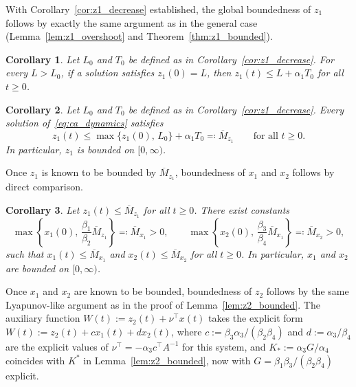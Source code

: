 \documentclass{article}
\newtheorem{corollary}{Corollary}
\begin{document}
With Corollary~\ref{cor:z1_decrease} established, the global boundedness 
of $z_1$ follows by exactly the same argument as in the general case 
(Lemma~\ref{lem:z1_overshoot} and Theorem~\ref{thm:z1_bounded}).

\begin{corollary}\label{cor:z1_overshoot_4d}
    Let $L_0$ and $T_0$ be defined as in Corollary~\ref{cor:z1_decrease}. For 
    every $L>L_0$, if a solution satisfies $z_1(0)=L$, then
    $z_1(t) \le L + \alpha_1 T_0$ for all $t\ge 0$.
\end{corollary}

\begin{corollary}\label{cor:z1_bounded_4d}
    Let $L_0$ and $T_0$ be defined as in Corollary~\ref{cor:z1_decrease}. Every 
    solution of~\eqref{eq:ca_dynamics} satisfies
    \begin{equation*}
        z_1(t) \le \max\{z_1(0),\,L_0\} + \alpha_1 T_0 \eqqcolon \overline{M}_{z_1}
        \qquad\text{for all } t\ge 0.
    \end{equation*}
    In particular, $z_1$ is bounded on $[0,\infty)$.
\end{corollary}

Once $z_1$ is known to be bounded by $\overline{M}_{z_1}$, boundedness of $x_1$ 
and $x_2$ follows by direct comparison.

\begin{corollary}\label{cor:x_bounded_4d}
    Let $z_1(t)\le \overline{M}_{z_1}$ for all $t\ge 0$. There exist constants
    \begin{equation*}
        \max\left\{x_1(0),\,\frac{\beta_1}{\beta_2}\overline{M}_{z_1}\right\}\eqqcolon \overline{M}_{x_1}>0, \qquad
        \max\left\{x_2(0),\,\frac{\beta_3}{\beta_4}\overline{M}_{x_1}\right\}\eqqcolon \overline{M}_{x_2}>0,
    \end{equation*}
    such that
    $x_1(t)\le \overline{M}_{x_1}$ and $x_2(t)\le \overline{M}_{x_2}$ for all $t\ge 0$.
    In particular, $x_1$ and $x_2$ are bounded on $[0,\infty)$.
\end{corollary}

Once $x_1$ and $x_2$ are known to be bounded, boundedness of $z_2$ follows 
by the same Lyapunov-like argument as in the proof of Lemma~\ref{lem:z2_bounded}. 
The auxiliary function $W(t):=z_2(t)+\nu^\top x(t)$ takes the explicit form 
$W(t):=z_2(t)+cx_1(t)+dx_2(t)$, where $c:=\beta_3\alpha_3/(\beta_2\beta_4)$ 
and $d:=\alpha_3/\beta_4$ are the explicit values of 
$\nu^\top=-\alpha_3 c^\top A^{-1}$ for this system, and $K_*:=\alpha_3 G/\alpha_4$ 
coincides with $K^*$ in Lemma~\ref{lem:z2_bounded}, now with 
$G=\beta_1\beta_3/(\beta_2\beta_4)$ explicit.
\end{document}
